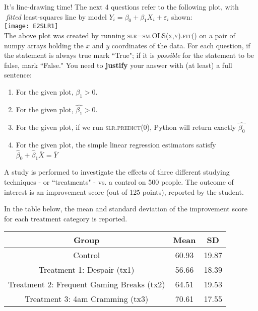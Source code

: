 \documentclass[addpoints]{exam}
\begin{document}
{\begin{questions}
\clearpage

\question[12] It's line-drawing time!  The next 4 questions refer to the following plot, with \textit{fitted} least-squares line by model $Y_i=\beta_0+ \beta_1X_i+\varepsilon_i$ shown:\\
\texttt{[image: E2SLR1]}\\
The above plot was created by running \textsc{slr=sm.OLS(x,y).fit()} on a pair of numpy arrays holding the $x$ and $y$ coordinates of the data.  For each question, if the statement is always true mark ``True"; if it is \textit{possible} for the statement to be false, mark ``False." You need to \textbf{justify} your answer with (at least) a full sentence:


\begin{enumerate}[label=(\alph*)]
	\item For the given plot, $\beta_1>0$.
	\item For the given plot, $\hat{\beta_1}>0$.
	\item For the given plot, if we run \textsc{slr.predict(0)}, Python will return exactly $\hat{\beta_0}$
	\item For the given plot,  the simple linear regression estimators satisfy $\hat{\beta}_0+\hat{\beta}_1 \bar{X}=\bar{Y}$
\end{enumerate}
\clearpage



\question[18] A study is performed to investigate the effects of three different studying techniques - or ``treatments" - vs. a control on 500 people. The outcome of interest is an improvement score (out of 125 points), reported by the student. 

In the table below, the mean and standard deviation of the improvement score for each treatment category is reported. 

\begin{center}
	\begin{tabular}{|c|c|c|} \hline
Group & Mean & SD\\ \hline
Control & 60.93 & 19.87\\
Treatment 1: Despair (tx1) & 56.66 & 18.39\\
Treatment 2: Frequent Gaming Breaks (tx2) & 64.51 & 19.53\\
Treatment 3: 4am Cramming (tx3) & 70.61 & 17.55\\ \hline
\end{tabular}
\end{center}


\end{questions}}
\end{document}
